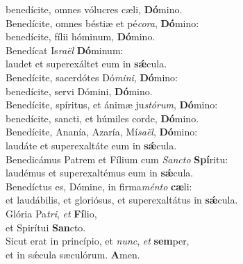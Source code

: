 \oddverse benedícite, omnes vólucres cæli, \textbf{Dó}mino.\\
\evenverse Benedícite, omnes béstiæ et pé\textit{co}\textit{ra}, \textbf{Dó}mino:~\*\\
\evenverse benedícite, fílii hóminum, \textbf{Dó}mino.\\
\oddverse Benedícat Is\textit{ra}\textit{ël} \textbf{Dó}minum:~\*\\
\oddverse laudet et superexáltet eum in \textbf{sǽ}cula.\\
\evenverse Benedícite, sacerdótes Dó\textit{mi}\textit{ni}, \textbf{Dó}mino:~\*\\
\evenverse benedícite, servi Dómini, \textbf{Dó}mino.\\
\oddverse Benedícite, spíritus, et ánimæ ju\textit{stó}\textit{rum}, \textbf{Dó}mino:~\*\\
\oddverse benedícite, sancti, et húmiles corde, \textbf{Dó}mino.\\
\evenverse Benedícite, Ananía, Azaría, Mí\textit{sa}\textit{ël}, \textbf{Dó}mino:~\*\\
\evenverse laudáte et superexaltáte eum in \textbf{sǽ}cula.\\
\oddverse Benedicámus Patrem et Fílium cum \textit{San}\textit{cto} \textbf{Spí}ritu:~\*\\
\oddverse laudémus et superexaltémus eum in \textbf{sǽ}cula.\\
\evenverse Benedíctus es, Dómine, in firma\textit{mén}\textit{to} \textbf{cæ}li:~\*\\
\evenverse et laudábilis, et gloriósus, et superexaltátus in \textbf{sǽ}cula.\\
\oddverse Glória Pa\textit{tri}, \textit{et} \textbf{Fí}lio,~\*\\
\oddverse et Spirítui \textbf{San}cto.\\
\evenverse Sicut erat in princípio, et \textit{nunc}, \textit{et} \textbf{sem}per,~\*\\
\evenverse et in sǽcula sæculórum. \textbf{A}men.\\
